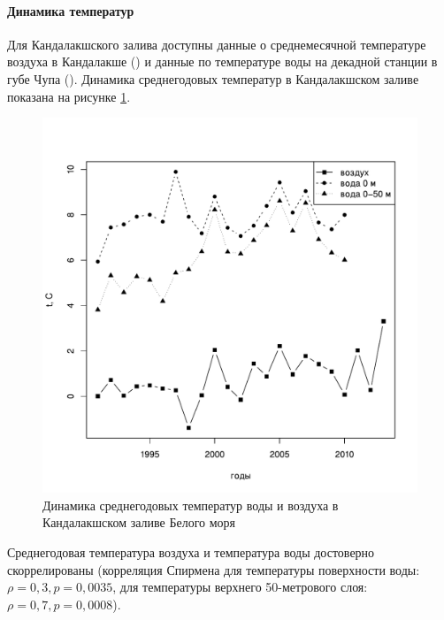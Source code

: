 		\paragraph{Динамика температур}
Для Кандалакшского залива доступны данные о среднемесячной температуре воздуха в Кандалакше (\cite{KGZ_letopis, rp5_Kandalaksha}) и данные по температуре воды на декадной станции в губе Чупа (\cite{Berger_et_al_2003}).  
Динамика среднегодовых температур в Кандалакшском заливе показана на рисунке \ref{ris:White_temp_year_dynamic}.
	\begin{figure}[p]
    \includegraphics[width=\textwidth]{../temperatures_water_air/White_temp_air_water_dynamic1.pdf}
    \caption{Динамика среднегодовых температур воды и воздуха в Кандалакшском заливе Белого моря}
    \label{ris:White_temp_year_dynamic}
	\end{figure}

Среднегодовая температура воздуха и температура воды достоверно скоррелированы (корреляция Спирмена для температуры поверхности воды: $\rho = 0,3, p = 0,0035$, для температуры верхнего 50-метрового слоя: $\rho = 0,7, p = 0,0008$).


